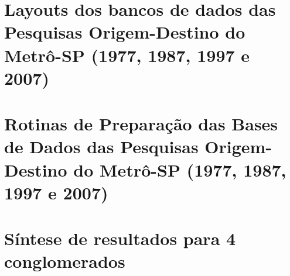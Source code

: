 \chapter{Layouts dos bancos de dados das Pesquisas Origem-Destino do Metrô-SP (1977, 1987, 1997 e 2007)}\label{chap:anexo_layouts}




\chapter{Rotinas de Preparação das Bases de Dados das Pesquisas Origem-Destino do Metrô-SP (1977, 1987, 1997 e 2007)}\label{chap:anexo_rotinas}




\chapter{Síntese de resultados para 4 conglomerados}\label{chap:anexo_4_clusters_td}

